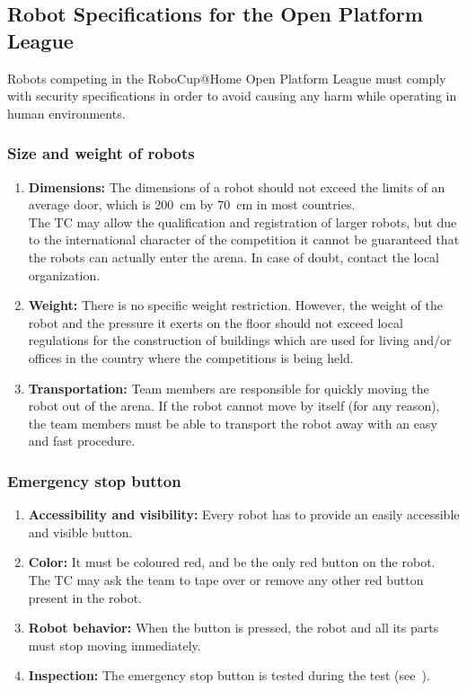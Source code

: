 \subsection{Robot Specifications for the Open Platform League }
Robots competing in the RoboCup@Home Open Platform League must comply with security specifications in order to avoid causing any harm while operating in human environments.

\subsubsection{Size and weight of robots}
\label{rule:robots_size}

\begin{enumerate}
	\item \textbf{Dimensions:} The dimensions of a robot should not exceed the limits of an average door, which is \SI{200}{\centi\meter} by \SI{70}{\centi\meter} in most countries.\\
	The TC may allow the qualification and registration of larger robots, but due to the international character of the competition it cannot be guaranteed that the robots can actually enter the arena. In case of doubt, contact the local organization.
	\item \textbf{Weight:} There is no specific weight restriction. However, the weight of the robot and the pressure it exerts on the floor should not exceed local regulations for the construction of buildings which are used for living and/or offices in the country where the competitions is being held.
	\item \textbf{Transportation:} Team members are responsible for quickly moving the robot out of the arena.	If the robot cannot move by itself (for any reason), the team members must be able to transport the robot away with an easy and fast procedure.
\end{enumerate}



\subsubsection{Emergency stop button}
\label{rule:robots_emergency_button}

\begin{enumerate}
	\item \textbf{Accessibility and visibility:} Every robot has to provide an easily accessible and visible  button.
	\item \textbf{Color:} It must be coloured red, and be the only red button on the robot.
	The TC may ask the team to tape over or remove any other red button present in the robot.
	\item \textbf{Robot behavior:} When the  button is pressed, the robot and all its parts must stop moving immediately.
	\item \textbf{Inspection:} The emergency stop button is tested during the  test (see~).
\end{enumerate}




